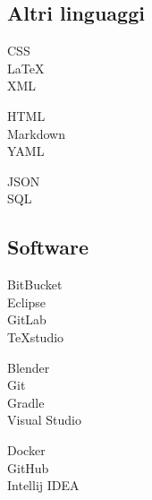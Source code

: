 \documentclass[curriculum-vitae]{subfiles}
\begin{document}
		\subsection*{Altri linguaggi}
			\begin{minipage}[t]{.3\textwidth}
				CSS \hfill {}\\
				\LaTeX \hfill {}\\
				XML \hfill {}\\ %
			\end{minipage}
			\hfill
			\begin{minipage}[t]{.3\textwidth}
				HTML \hfill {}\\
				Markdown \hfill {}\\
				YAML \hfill {}\\ %
			\end{minipage}
			\hfill
			\begin{minipage}[t]{.3\textwidth}
				JSON \hfill {}\\
				SQL \hfill {}\\ %
			\end{minipage}
		
		\subsection*{Software}
			\begin{minipage}[t]{.3\textwidth}
				BitBucket \hfill {}\\
				Eclipse \hfill {}\\
				GitLab \hfill {}\\
				TeXstudio \hfill {}\\  %
			\end{minipage}
			\hfill
			\begin{minipage}[t]{.3\textwidth}
				Blender \hfill {}\\
				Git \hfill {}\\
				Gradle \hfill {}\\
				Visual Studio \hfill {}\\  %
			\end{minipage}
			\hfill
			\begin{minipage}[t]{.3\textwidth}
				Docker \hfill {}\\
				GitHub \hfill {}\\
				Intellij IDEA \hfill {}\\ %
			\end{minipage}
\end{document}
